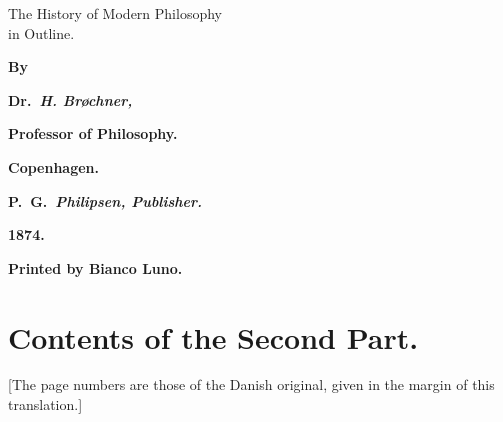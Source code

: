 \begin{center}
  {\LARGE The History of Modern Philosophy}\\[8pt]
  {\LARGE in Outline.}
\end{center}
\vspace{18pt}
\begin{center}
  \textbf{By}
\end{center}
\vspace{10pt}
\begin{center}
  \textbf{Dr.\ \emph{H. Brøchner,}}
\end{center}
\begin{center}
  \textbf{Professor of Philosophy.}
\end{center}
\vspace{14pt}
\dblrule
\vspace{18pt}
\begin{center}
  \textbf{Copenhagen.}
\end{center}
\begin{center}
  \textbf{P.\ G.\ \emph{Philipsen, Publisher.}}
\end{center}
\begin{center}
  \textbf{1874.}
\end{center}
\newpage
\thispagestyle{empty}
\vspace*{0.62\textheight}
\begin{center}
  \textbf{Printed by Bianco Luno.}
\end{center}

\chapter*{Contents of the Second Part.}

\divrule

{\small [The page numbers are those of the Danish original, given in the
margin of this translation.]\par}
\medskip

